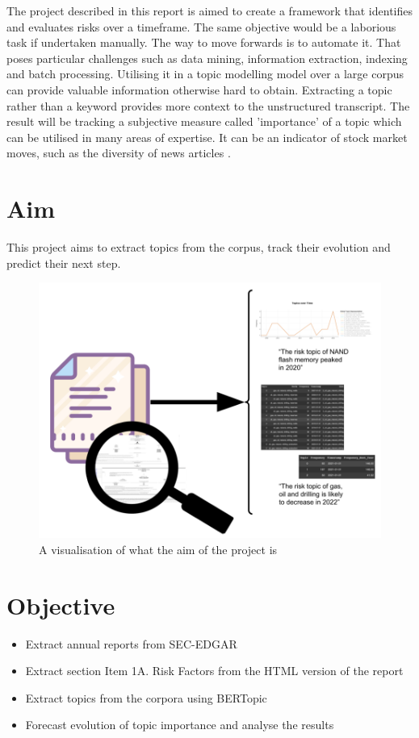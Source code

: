 \documentclass[12pt,MSc,a4paper,oneside]{muthesis}
\begin{document}
The project described in this report is aimed to create a framework that identifies and evaluates risks over a timeframe. The same objective would be a laborious task if undertaken manually. The way to move forwards is to automate it. That poses particular challenges such as data mining, information extraction, indexing and batch processing. Utilising it in a topic modelling model over a large corpus can provide valuable information otherwise hard to obtain.
Extracting a topic rather than a keyword provides more context to the unstructured transcript. The result will be tracking a subjective measure called 'importance' of a topic which can be utilised in many areas of expertise. It can be an indicator of stock market moves, such as the diversity of news articles \citep{curme_zhuo_moat_preis_2017}. 

\section{Aim}
This project aims to extract topics from the corpus, track their evolution and predict their next step.
\begin{figure}[h]
\centering
\includegraphics{images/abstract/Aim_image.png}
\caption{A visualisation of what the aim of the project is}
\end{figure}

\section{Objective}
\begin{itemize}
  \item Extract annual reports from SEC-EDGAR
  \item Extract section Item 1A. Risk Factors from the HTML version of the report
  \item Extract topics from the corpora using BERTopic
  \item Forecast evolution of topic importance and analyse the results
\end{itemize}
\end{document}
